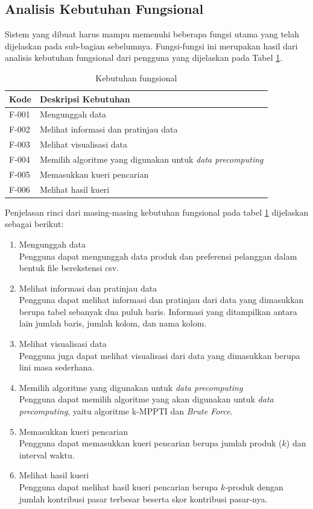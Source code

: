 \subsection{Analisis Kebutuhan Fungsional}
\tab Sistem yang dibuat harus mampu memenuhi beberapa fungsi utama yang telah dijelaskan pada sub-bagian sebelumnya. Fungsi-fungsi ini merupakan hasil dari analisis kebutuhan fungsional dari pengguna yang dijelaskan pada Tabel \ref{tab:kebutuhan-fungsional}.

\begin{table}[H]
	\centering
	\begin{tabular}{ | p{2cm} | p{7cm} | }
		\hline
		\textbf{Kode} & \textbf{Deskripsi Kebutuhan} \\ \hline \hline
		F-001 & Mengunggah data \\ \hline
		F-002 & Melihat informasi dan pratinjau data \\ \hline
		F-003 & Melihat visualisasi data  \\ \hline
		F-004 & Memilih algoritme yang digunakan untuk \textit{data precomputing}\\ \hline
		F-005 & Memasukkan kueri pencarian \\ \hline
		F-006 & Melihat hasil kueri \\ \hline
	\end{tabular} \caption{Kebutuhan fungsional}
	\label{tab:kebutuhan-fungsional}
\end{table}

Penjelasan rinci dari masing-masing kebutuhan fungsional pada tabel \ref{tab:kebutuhan-fungsional} dijelaskan sebagai berikut:
\begin{enumerate}
	\item Mengunggah data\\
	Pengguna dapat mengunggah data produk dan preferensi pelanggan dalam bentuk file berekstensi csv.
	\item Melihat informasi dan pratinjau data \\
	Pengguna dapat melihat informasi dan pratinjau dari data yang dimasukkan berupa tabel sebanyak dua puluh baris. Informasi yang ditampilkan antara lain jumlah baris, jumlah kolom, dan nama kolom.
	\item Melihat visualisasi data \\
	Pengguna juga dapat melihat visualisasi dari data yang dimasukkan berupa lini masa sederhana.
	\item Memilih algoritme yang digunakan untuk \textit{data precomputing} \\
	Pengguna dapat memilih algoritme yang akan digunakan untuk \textit{data precomputing}, yaitu algoritme k-MPPTI dan \textit{Brute Force}.
	\item Memasukkan kueri pencarian \\
	Pengguna dapat memasukkan kueri pencarian berupa jumlah produk ($k$) dan interval waktu.
	\item Melihat hasil kueri \\
	Pengguna dapat melihat hasil kueri pencarian berupa $k$-produk dengan jumlah kontribusi pasar terbesar beserta skor kontribusi pasar-nya. 
\end{enumerate}

